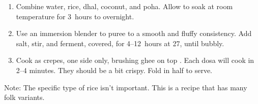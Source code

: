 
\begin{minipage}{.49\textwidth}
  
\begin{ingredients}
\end{ingredients}
\end{minipage}
\begin{minipage}{.49\textwidth}
  
\begin{ingredients}
\end{ingredients}
\end{minipage}

\begin{recipe}
  \begin{enumerate}

  \item Combine water, rice, dhal, coconut, and poha.  Allow to soak
    at room temperature for 3~hours to overnight.

  \item Use an immersion blender to puree to a smooth and fluffy
    consistency.  Add salt, stir, and ferment, covered, for
    4--12~hours at 27\degreeC, until bubbly.

  \item Cook as crepes, one side only, brushing ghee on top .  Each
    dosa will cook in 2--4 minutes.  They should be a bit crispy.
    Fold in half to serve.

  \end{enumerate}
\end{recipe}

Note: The specific type of rice isn't important.  This is a recipe
that has many folk variants.


